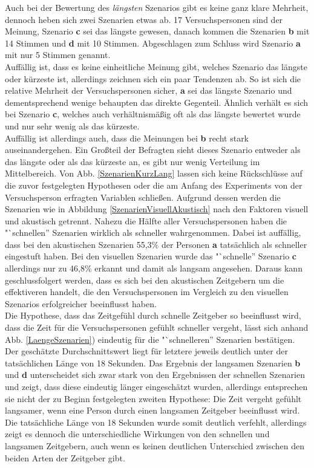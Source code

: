 \documentclass{Paper}
\begin{document}
Auch bei der Bewertung des \textit{längsten} Szenarios gibt es keine ganz klare Mehrheit, dennoch heben sich zwei Szenarien etwas ab. 17 Versuchspersonen sind der Meinung, Szenario \textbf{c} sei das längste gewesen, danach kommen die Szenarien \textbf{b} mit 14 Stimmen und \textbf{d} mit 10 Stimmen. Abgeschlagen zum Schluss wird Szenario \textbf{a} mit nur 5 Stimmen genannt.\\
Auffällig ist, dass es keine einheitliche Meinung gibt, welches Szenario das längste oder kürzeste ist, allerdings zeichnen sich ein paar Tendenzen ab. So ist sich die relative Mehrheit der Versuchspersonen sicher, \textbf{a} sei das längste Szenario und dementsprechend wenige behaupten das direkte Gegenteil. Ähnlich verhält es sich bei Szenario \textbf{c}, welches auch verhältnismäßig oft als das längste bewertet wurde und nur sehr wenig als das kürzeste.\\
Auffällig ist allerdings auch, dass die Meinungen bei \textbf{b} recht stark auseinandergehen. Ein Großteil der Befragten sieht dieses Szenario entweder als das längste oder als das kürzeste an, es gibt nur wenig Verteilung im Mittelbereich.
Von Abb. \ref{SzenarienKurzLang} lassen sich keine Rückschlüsse auf die zuvor festgelegten Hypothesen oder die am Anfang des Experiments von der Versuchsperson erfragten Variablen schließen. Aufgrund dessen werden die Szenarien wie in Abbildung \ref{SzenarienVisuellAkustisch}
nach den Faktoren visuell und akustisch getrennt. Nahezu die Hälfte aller Versuchspersonen haben die "`schnellen'' Szenarien wirklich als schneller wahrgenommen. Dabei ist auffällig, dass bei den akustischen Szenarien 55,3\% der Personen \textbf{a} tatsächlich als schneller eingestuft haben. Bei den visuellen Szenarien wurde das "`schnelle'' Szenario \textbf{c} allerdings nur zu 46,8\% erkannt und damit als langsam angesehen. Daraus kann geschlussfolgert werden, dass es sich bei den akustischen Zeitgebern um die effektiveren handelt, die den Versuchspersonen im Vergleich zu den visuellen Szenarios erfolgreicher beeinflusst haben.\\
Die Hypothese, dass das Zeitgefühl durch schnelle Zeitgeber so beeinflusst
wird, dass die Zeit für die Versuchspersonen gefühlt schneller vergeht, lässt sich anhand Abb. \ref{LaengeSzenarien}) eindeutig für die "`schnelleren'' Szenarien bestätigen. Der geschätzte Durchschnittswert liegt für letztere jeweils deutlich unter der
tatsächlichen Länge von 18 Sekunden. Das Ergebnis der langsamen Szenarien \textbf{b} und
\textbf{d} unterscheidet sich zwar stark von den Ergebnissen der schnellen
Szenarien und zeigt, dass diese eindeutig länger eingeschätzt wurden, allerdings
entsprechen sie nicht der zu Beginn festgelegten zweiten Hypothese: Die Zeit vergeht
gefühlt langsamer, wenn eine Person durch einen langsamen Zeitgeber beeinflusst wird. Die
tatsächliche Länge von 18 Sekunden wurde somit deutlich verfehlt, allerdings zeigt es dennoch
die unterschiedliche Wirkungen von den schnellen und langsamen Zeitgebern, auch wenn es keinen
deutlichen Unterschied zwischen den beiden Arten der Zeitgeber gibt.
       
\end{document}
